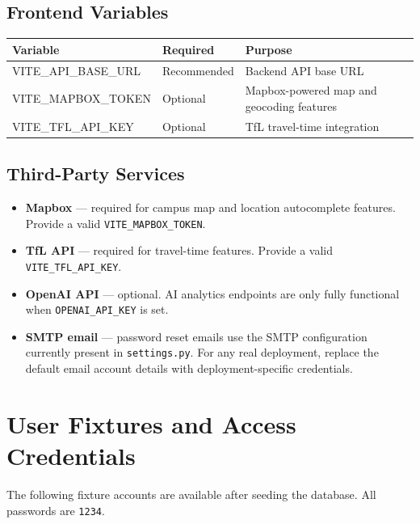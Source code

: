 \documentclass[a4paper, 12pt]{report}
\begin{document}
\section{Frontend Variables}

\begin{center}
\begin{longtable}{lll}
\toprule
\textbf{Variable} & \textbf{Required} & \textbf{Purpose} \\
\midrule
VITE\_API\_BASE\_URL & Recommended & Backend API base URL \\
VITE\_MAPBOX\_TOKEN & Optional & Mapbox-powered map and geocoding features \\
VITE\_TFL\_API\_KEY & Optional & TfL travel-time integration \\
\bottomrule
\end{longtable}
\end{center}

\section{Third-Party Services}

\begin{itemize}
    \item \textbf{Mapbox} --- required for campus map and location
          autocomplete features. Provide a valid
          \texttt{VITE\_MAPBOX\_TOKEN}.
    \item \textbf{TfL API} --- required for travel-time features.
          Provide a valid \texttt{VITE\_TFL\_API\_KEY}.
    \item \textbf{OpenAI API} --- optional. AI analytics endpoints are
          only fully functional when \texttt{OPENAI\_API\_KEY} is set.
    \item \textbf{SMTP email} --- password reset emails use the SMTP
          configuration currently present in \texttt{settings.py}. For
          any real deployment, replace the default email account details
          with deployment-specific credentials.
\end{itemize}

\chapter{User Fixtures and Access Credentials}

The following fixture accounts are available after seeding the
database. All passwords are \texttt{1234}.
\end{document}
